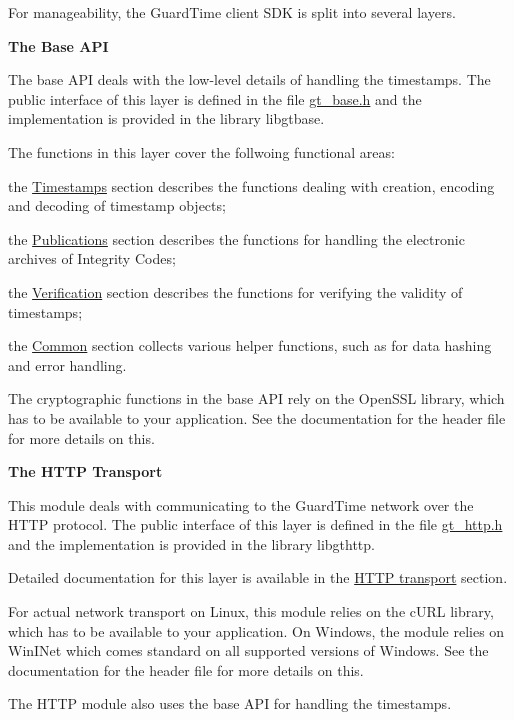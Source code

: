 For manageability, the GuardTime client SDK is split into several layers.

{\bfseries The Base API}

The base API deals with the low-\/level details of handling the timestamps. The public interface of this layer is defined in the file {\ttfamily \hyperlink{gt__base_8h}{gt\_\-base.h}} and the implementation is provided in the library {\ttfamily libgtbase}.

The functions in this layer cover the follwoing functional areas:
\begin{DoxyItemize}
\item the \hyperlink{group__timestamps}{Timestamps} section describes the functions dealing with creation, encoding and decoding of timestamp objects;
\item the \hyperlink{group__publications}{Publications} section describes the functions for handling the electronic archives of Integrity Codes;
\item the \hyperlink{group__verification}{Verification} section describes the functions for verifying the validity of timestamps;
\item the \hyperlink{group__common}{Common} section collects various helper functions, such as for data hashing and error handling.
\end{DoxyItemize}

The cryptographic functions in the base API rely on the OpenSSL library, which has to be available to your application. See the documentation for the header file for more details on this.

{\bfseries The HTTP Transport}

This module deals with communicating to the GuardTime network over the HTTP protocol. The public interface of this layer is defined in the file {\ttfamily \hyperlink{gt__http_8h}{gt\_\-http.h}} and the implementation is provided in the library {\ttfamily libgthttp}.

Detailed documentation for this layer is available in the \hyperlink{group__http}{HTTP transport} section.

For actual network transport on Linux, this module relies on the cURL library, which has to be available to your application. On Windows, the module relies on WinINet which comes standard on all supported versions of Windows. See the documentation for the header file for more details on this.

The HTTP module also uses the base API for handling the timestamps.

